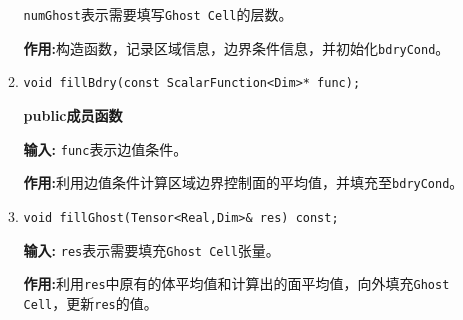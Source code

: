 \documentclass[UTF8]{ctexart}
\theoremstyle{plain}
\theoremstyle{definition}
\theoremstyle{remark}
\begin{document}
\begin{itemize}
\begin{enumerate}
        \texttt{numGhost}表示需要填写\texttt{Ghost Cell}的层数。

        \textbf{作用:}构造函数，记录区域信息，边界条件信息，并初始化\texttt{bdryCond}。

        \item \texttt{void fillBdry(const ScalarFunction<Dim>* func);}
        
        \textbf{public成员函数}

        \textbf{输入:} \texttt{func}表示边值条件。

        \textbf{作用:}利用边值条件计算区域边界控制面的平均值，并填充至\texttt{bdryCond}。

        \item \texttt{void fillGhost(Tensor<Real,Dim>\& res) const;}
        
        \textbf{输入:} \texttt{res}表示需要填充\texttt{Ghost Cell}张量。

        \textbf{作用:}利用\texttt{res}中原有的体平均值和计算出的面平均值，向外填充\texttt{Ghost Cell}，更新\texttt{res}的值。
    \end{enumerate}
\end{itemize}
\end{document}
